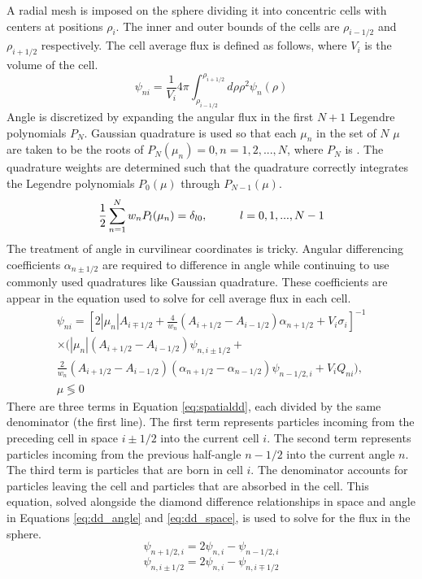 \documentclass[11pt, oneside]{article}   	%
\newcommand\tab[1][1cm]{\hspace*{#1}}				%
\begin{document}
A radial mesh is imposed on the sphere dividing it into concentric cells with centers at positions $\rho_i$. The inner and outer bounds of the cells are $\rho_{i-1/2}$ and $\rho_{i+1/2}$ respectively. The cell average flux is defined as follows, where $V_i$ is the volume of the cell.
%
\begin{equation}
\psi_{ni} = \frac{1}{V_i}4\pi\int_{\rho_{i-1/2}}^{\rho_{i+1/2}}{d\rho\rho^2\psi_n(\rho)}
\end{equation}
%
Angle is discretized by expanding the angular flux in the first $N+1$ Legendre polynomials $P_N$. Gaussian quadrature is used so that each $\mu_n$ in the set of $N$ $\mu$ are taken to be the roots of $P_N(\mu_n) = 0, n=1, 2,...,N$, where $P_N$ is . The quadrature weights are determined such that the quadrature correctly integrates the Legendre polynomials $P_0(\mu)$ through $P_{N-1}(\mu)$.
%
\begin{equation}
\frac{1}{2}\sum_{n=1}^N{w_n P_l(\mu_n)} = \delta_{l0}, \tab l = 0, 1, ..., N-1
\end{equation}
%
The treatment of angle in curvilinear coordinates is tricky. Angular differencing coefficients $\alpha_{n\pm1/2}$ are required to difference in angle while continuing to use commonly used quadratures like Gaussian quadrature. These coefficients are appear in the equation used to solve for cell average flux in each cell. 
%
\begin{equation}\label{eq:spatialdd}
\begin{aligned}
\psi_{ni} = \left[ 2\left| \mu_n \right| A_{i \mp 1/2} + \frac{4}{w_n}\left(A_{i+1/2}-A_{i-1/2}\right)\alpha_{n+1/2}+V_i\sigma_i \right]^{-1} \\
\times \bigg( \left| \mu_n \right| \left(A_{i+1/2}-A_{i-1/2}\right)\psi_{n,i \pm 1/2} + \\
\frac{2}{w_n}\left(A_{i+1/2}-A_{i-1/2}\right)\left(\alpha_{n+1/2}-\alpha_{n-1/2}\right)\psi_{n-1/2,i}+V_i Q_{ni} \bigg), \\
\mu \lessgtr 0
\end{aligned}
\end{equation}
%
There are three terms in Equation \ref{eq:spatialdd}, each divided by the same denominator (the first line). The first term represents particles incoming from the preceding cell in space $i \pm 1/2$ into the current cell $i$. The second term represents particles incoming from the previous half-angle $n-1/2$ into the current angle $n$. The third term is particles that are born in cell $i$. The denominator accounts for particles leaving the cell and particles that are absorbed in the cell. This equation, solved alongside the diamond difference relationships in space and angle in Equations \ref{eq:dd_angle} and \ref{eq:dd_space}, is used to solve for the flux in the sphere.
%
\begin{equation}\label{eq:dd_angle}
\psi_{n+1/2,i} = 2\psi_{n,i}-\psi_{n-1/2,i}
\end{equation}
%
\begin{equation}\label{eq:dd_space}
\psi_{n,i \pm 1/2} = 2\psi_{n,i}-\psi_{n,i\mp1/2}
\end{equation}
\end{document}

